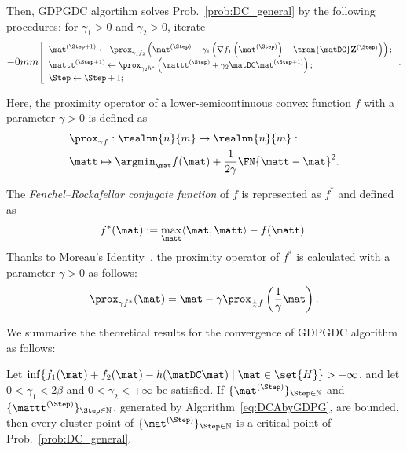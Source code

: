 \documentclass[journal]{IEEEtran}
\begin{document}
Then, GDPGDC algortihm solves Prob.~\eqref{prob:DC_general} by the following procedures: for $\gamma_1 > 0$ and $\gamma_2 > 0$, iterate
\begin{equation}
    \label{eq:DCAbyGDPG}
    \resizebox{\linewidth-0mm}{!}{$
    \left\lfloor
    \begin{array}{l}
        \mat^{(\Step + 1)} \leftarrow \prox_{\gamma_{1} f_{2}} \left(\mat^{(\Step)} - \gamma_{1} \left(\nabla f_{1} \left(\mat^{(\Step)}\right) - \tran{\matDC} \mathbf{Z}^{(\Step)}\right)\right); \\
        \mattt^{(\Step+1)} \leftarrow \prox_{\gamma_{2}h^{*}} \left(\mattt^{(\Step)} + \gamma_{2}\matDC \mat^{(\Step + 1)}\right);\\
        \Step \leftarrow \Step + 1;
    \end{array}
    \right..
    $}
\end{equation}

Here, the proximity operator of a lower-semicontinuous convex function $f$ with a parameter $\gamma > 0$ is defined as~\cite{bauschke2011convex}
\begin{equation} \label{eq:prox_f2}
\begin{aligned}
    &\prox_{\gamma f}:\realnn{n}{m}\rightarrow\realnn{n}{m}: \\
    &\matt \mapsto \argmin_{\mat} f(\mat) + \frac{1}{2\gamma} \FN{\matt - \mat}^{2}.
\end{aligned}
\end{equation}

The \textit{Fenchel–Rockafellar conjugate function} of $f$ is represented as $f^{*}$ and defined as
\begin{equation}
    f^*(\mat):=\max_{\matt}\langle \mat, \matt \rangle - f(\matt).
\end{equation}
Thanks to Moreau's Identity~\cite[Theorem~14.3(ii)]{bauschke2017correction}, the proximity operator of $f^*$ is calculated with a parameter $\gamma > 0$ as follows:
\begin{equation} \label{eqDCh}
    \prox_{\gamma f^*}(\mat) = \mat - \gamma \prox_{\frac{1}{\gamma} f}\left(\frac{1}{\gamma}\mat\right).
\end{equation}

We summarize the theoretical results for the convergence of GDPGDC algorithm as follows:
\begin{theo}
\label{theo:convergence_GDPGDC}
Let $\inf \{ f_1(\mat) + f_2(\mat) - h(\matDC \mat) \; | \; \mat \in \set{H} \} > - \infty$, and let $0 < \gamma_1 < 2 \beta$ and $0 < \gamma_2 < +\infty$ be satisfied. If $\{\mat^{(\Step)}\}_{\Step \in \mathbb{N}}$ and $\{\mattt^{(\Step)}\}_{\Step \in \mathbb{N}}$, generated by Algorithm~\eqref{eq:DCAbyGDPG}, are bounded, then every cluster point of $\{\mat^{(\Step)}\}_{\Step \in \mathbb{N}}$ is a critical point of Prob.~\eqref{prob:DC_general}.
\end{theo}
\end{document}
